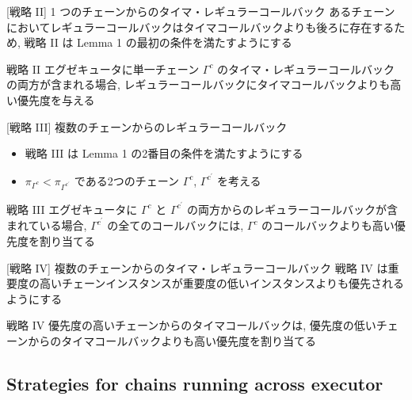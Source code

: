 \begin{frame}[label=strategy2]{[戦略 II] 1 つのチェーンからのタイマ・レギュラーコールバック}
    あるチェーンにおいてレギュラーコールバックはタイマコールバックよりも後ろに存在するため, 戦略 II は Lemma 1 の最初の条件を満たすようにする
    \begin{block}{戦略 II}
        エグゼキュータに単一チェーン $\Gamma^{c}$ のタイマ・レギュラーコールバックの両方が含まれる場合, レギュラーコールバックにタイマコールバックよりも高い優先度を与える
    \end{block}
\end{frame}

\begin{frame}[label=strategy3]{[戦略 III] 複数のチェーンからのレギュラーコールバック}
    \begin{itemize}
        \item 戦略 III は Lemma 1 の2番目の条件を満たすようにする
        \item $\pi_{\Gamma^{c}}<\pi_{\Gamma^{c^{\prime}}}$ である2つのチェーン $\Gamma^{c}$, $\Gamma^{c^{\prime}}$ を考える
    \end{itemize}
    \begin{block}{戦略 III}
        エグゼキュータに $\Gamma^{c}$ と $\Gamma^{c^{\prime}}$ の両方からのレギュラーコールバックが含まれている場合, $\Gamma^{c^{\prime}}$ の全てのコールバックには, $\Gamma^{c}$ のコールバックよりも高い優先度を割り当てる
    \end{block}
\end{frame}

\begin{frame}[label=strategy4]{[戦略 IV] 複数のチェーンからのタイマ・レギュラーコールバック}
    戦略 IV は重要度の高いチェーンインスタンスが重要度の低いインスタンスよりも優先されるようにする
    \begin{block}{戦略 IV}
        優先度の高いチェーンからのタイマコールバックは, 優先度の低いチェーンからのタイマコールバックよりも高い優先度を割り当てる
    \end{block}
\end{frame}


\subsection{Strategies for chains running across executor}
\label{ssec: strategies for chains running across executor}

